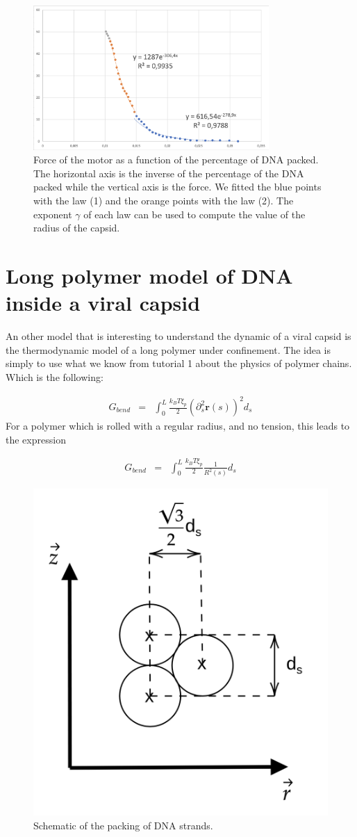 \documentclass{article}
\begin{document}
\begin{figure}[H]
    \centering
    \includegraphics[width=0.8\textwidth]{Fig_Exponents.png}
    \caption{Force of the motor as a function of the percentage of DNA packed. The horizontal axis is the inverse of the percentage of the DNA packed while the vertical axis is the force. We fitted the blue points with the law (1) and the orange points with the law (2). The exponent $\gamma$ of each law can be used to compute the value of the radius of the capsid.}
    \label{fig:force}
\end{figure}

\section{Long polymer model of DNA inside a viral capsid}
An other model that is interesting to understand the dynamic of a viral capsid is the thermodynamic model of a long polymer under confinement. The idea is simply to use what we know from tutorial 1 about the physics of polymer chains. Which is the following:

\begin{eqnarray}
    G_{bend} & = & \int_{0}^{L} \frac{k_B T \xi_p}{2} \left( \partial_s^2 \mathbf{r}(s) \right)^2 d_s
\end{eqnarray}
For a polymer which is rolled with a regular radius, and no tension, this leads to the expression

\begin{eqnarray}
    G_{bend} & = & \int_{0}^{L} \frac{k_B T \xi_p}{2} \frac{1}{R^2(s)} d_s
\end{eqnarray}

\begin{figure}[H]
    \centering
    \includegraphics[height=0.3\textwidth]{schema_packing.png}
    \caption{Schematic of the packing of DNA strands.}
    \label{fig:force}
\end{figure}
\end{document}
